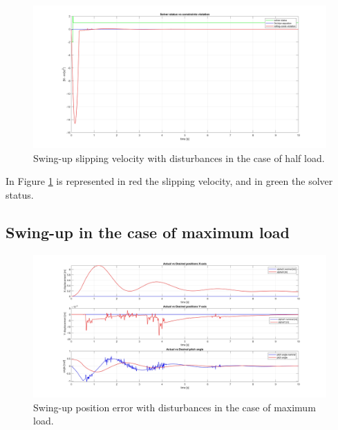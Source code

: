 \begin{figure}
    \centering
    \includegraphics[width=1\linewidth]{Images/Robustness analysis/intermediate load/Swing-Up/Slipping_velocity.jpg}
    \caption{Swing-up slipping velocity with disturbances in the case of half load.}
    \label{fig:Swing-up slipping velocity with disturbances in the case of half load}
\end{figure}

In Figure \ref{fig:Swing-up slipping velocity with disturbances in the case of half load} is represented in red the slipping velocity, and in green the solver status.

\subsection{Swing-up in the case of maximum load}
\label{subsec:Swing-up in the case of maximum load}

\begin{figure}
    \centering
    \includegraphics[width=1\linewidth]{Images/Robustness analysis/maximum load/Swing-Up/Position_error.jpg}
    \caption{Swing-up position error with disturbances in the case of maximum load.}
    \label{fig:Swing-up position error with disturbances in the case of maximum load}
\end{figure}

